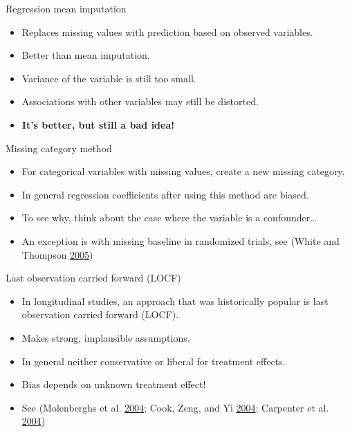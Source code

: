 \documentclass[ignorenonframetext,]{beamer}
\providecommand{\tightlist}{%
  \setlength{\itemsep}{0pt}\setlength{\parskip}{0pt}}
\begin{document}
\begin{frame}{Regression mean imputation}
\protect\hypertarget{regression-mean-imputation}{}

\begin{itemize}
\tightlist
\item
  Replaces missing values with prediction based on observed variables.
\item
  Better than mean imputation.
\item
  Variance of the variable is still too small.
\item
  Associations with other variables may still be distorted.
\item
  \textbf{It's better, but still a bad idea!}
\end{itemize}

\end{frame}

\begin{frame}{Missing category method}
\protect\hypertarget{missing-category-method}{}

\begin{itemize}
\tightlist
\item
  For categorical variables with missing values, create a new missing
  category.
\item
  In general regression coefficients after using this method are biased.
\item
  To see why, think about the case where the variable is a
  confounder\ldots{}
\item
  An exception is with missing baseline in randomized trials, see (White
  and Thompson \protect\hyperlink{ref-Whiteux2fThompson:2005}{2005})
\end{itemize}

\end{frame}

\begin{frame}{Last observation carried forward (LOCF)}
\protect\hypertarget{last-observation-carried-forward-locf}{}

\begin{itemize}
\tightlist
\item
  In longitudinal studies, an approach that was historically popular is
  last observation carried forward (LOCF).
\item
  Makes strong, implausible assumptions.
\item
  In general neither conservative or liberal for treatment effects.
\item
  Bias depends on unknown treatment effect!
\item
  See (Molenberghs et al.
  \protect\hyperlink{ref-Molenberghsux2fThijs:2004}{2004}; Cook, Zeng,
  and Yi \protect\hyperlink{ref-Cookux2fZengux2fYi:2004}{2004};
  Carpenter et al.
  \protect\hyperlink{ref-Carpenterux2fKenwardux2fEvansux2fWhite:2004}{2004})
\end{itemize}

\end{frame}
\end{document}

